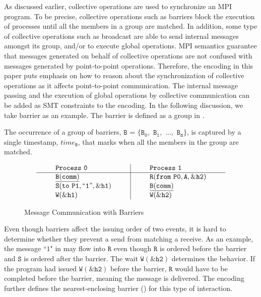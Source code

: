 As discussed earlier, collective operations are used to synchronize an MPI program. To be precise, collective operations such as barriers block the execution of processes until all the members in a group are matched. In addition, some type of collective operations such as broadcast are able to send internal messages amongst its group, and/or to execute global operations. MPI semantics guarantee that messages generated on behalf of collective operations are not confused with messages generated by point-to-point operations. Therefore, the encoding in this paper puts emphasis on how to reason about the synchronization of collective operations as it affects point-to-point communication. The internal message passing and the execution of global operations by collective communication can be added as SMT constraints to the encoding. In the following discussion, we take barrier as an example. The barrier is defined as a group in . 

\begin{definition}[Barrier]\label{def:barrier}
The occurrence of a group of barriers, $\mathtt{B}$ = $\{\mathtt{B_0},$ $\mathtt{B_1},$ $...,$ $\mathtt{B_n}\}$, is captured by a
single timestamp, $\mathit{time}_\mathtt{B}$, that marks when all the members in the group are matched.  
\end{definition}

\begin{figure}[b]
\[
\begin{array}{l|l}
\;\;\;\;\;\;\;\;\mathtt{Process\ 0}\;\;\;\;\;\;\;\; & \;\;\;\;\;\;\;\; \mathtt{Process\ 1}\;\;\;\;\;\;\;\; \\
\hline
\;\;\;\;\;\;\;\;\mathtt{\underline{B(comm)}}\;\;\;\;\;\;\;\; & \;\;\;\;\;\;\;\; \mathtt{R(from\ P0,A,\&h2)}\;\;\;\;\;\;\;\; \\
\;\;\;\;\;\;\;\;\mathtt{S(to\ P1,``1",\&h1)}\;\;\;\;\;\;\;\; & \;\;\;\;\;\;\;\; \mathtt{\underline{B(comm)}}\;\;\;\;\;\;\;\; \\
\;\;\;\;\;\;\;\;\mathtt{W(\&h1)}\;\;\;\;\;\;\;\; & \;\;\;\;\;\;\;\; \mathtt{W(\&h2)}\;\;\;\;\;\;\;\; \\
\end{array}
\]
\caption{Message Communication with Barriers} \label{fig:mc_barrier1}
\end{figure}

Even though barriers affect the issuing order of two events, it is hard to determine whether they prevent a send from matching a receive. As an example, the message ``$1$" in  may flow into $\mathtt{R}$ even though $\mathtt{R}$ is ordered before the barrier and $\mathtt{S}$ is ordered after the barrier. The wait $\mathtt{W(\&h2)}$ determines the behavior. If the program had issued $\mathtt{W(\&h2)}$ before the barrier, $\mathtt{R}$ would have to be completed before the barrier, meaning the message is delivered. The encoding further defines the nearest-enclosing barrier () for this type of interaction.

